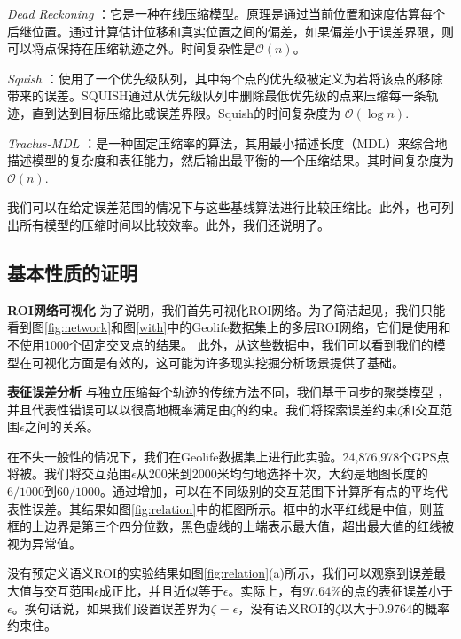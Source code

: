 \emph{Dead Reckoning} \cite{trajcevski2006line,muckell2011squish}：它是一种在线压缩模型。原理是通过当前位置和速度估算每个后继位置。通过计算估计位移和真实位置之间的偏差，如果偏差小于误差界限，则可以将点保持在压缩轨迹之外。时间复杂性是$\mathcal{O}(n)$。

\emph{Squish} \cite{muckell2011squish,muckell2014compression}：使用了一个优先级队列，其中每个点的优先级被定义为若将该点的移除带来的误差。SQUISH通过从优先级队列中删除最低优先级的点来压缩每一条轨迹，直到达到目标压缩比或误差界限。Squish的时间复杂度为
$\mathcal{O}(\log n)$.

\emph{Traclus-MDL} \cite{lee2007trajectory}：是一种固定压缩率的算法，其用最小描述长度（MDL）\cite{grunwald2005advances}来综合地描述模型的复杂度和表征能力，然后输出最平衡的一个压缩结果。其时间复杂度为$\mathcal{O}(n)$.

我们可以在给定误差范围的情况下与这些基线算法进行比较压缩比。此外，也可列出所有模型的压缩时间以比较效率。此外，我们还说明了。



\subsection{基本性质的证明}
\vspace{3mm}
\noindent\textbf{ROI网络可视化}
为了说明，我们首先可视化ROI网络。为了简洁起见，我们只能看到图\ref{fig:network}和图\ref{with}中的Geolife数据集上的多层ROI网络，它们是使用和不使用1000个固定交叉点的结果。 此外，从这些数据中，我们可以看到我们的模型在可视化方面是有效的，这可能为许多现实挖掘分析场景提供了基础。


\vspace{3mm}
\noindent\textbf{表征误差分析}
与独立压缩每个轨迹的传统方法不同，我们基于同步的聚类模型 ，并且代表性错误可以以很高地概率满足由$\zeta$的约束。我们将探索误差约束$\zeta$和交互范围$\epsilon$之间的关系。

在不失一般性的情况下，我们在Geolife数据集上进行此实验。24,876,978个GPS点将被。我们将交互范围$\epsilon$从200米到2000米均匀地选择十次，大约是地图长度的$6/1000$到$60/1000$。通过增加，可以在不同级别的交互范围下计算所有点的平均代表性误差。其结果如图\ref{fig:relation}中的框图所示。框中的水平红线是中值，则蓝框的上边界是第三个四分位数，黑色虚线的上端表示最大值，超出最大值的红线被视为异常值。

没有预定义语义ROI的实验结果如图\ref{fig:relation}(a)所示，我们可以观察到误差最大值与交互范围$\epsilon$成正比，并且近似等于$\epsilon$。实际上，有$97.64\%$的点的表征误差小于$\epsilon$。换句话说，如果我们设置误差界为$\zeta=\epsilon$，没有语义ROI的$\zeta$以大于$0.9764$的概率约束住。

